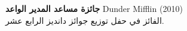 \textbf{جائزة مساعد المدير الواعد} \hfill \foreignlanguage{english}{Dunder Mifflin (2010)}\\
الفائز في حفل توزيع جوائز دانديز الرابع عشر.\\
\vspace*{2mm}